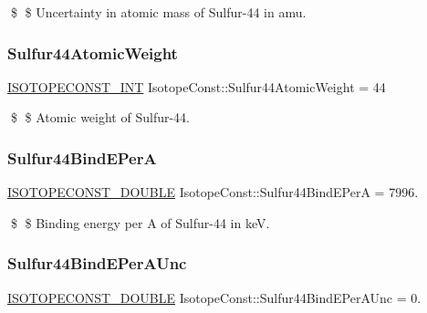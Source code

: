 \$ \$ Uncertainty in atomic mass of Sulfur-\/44 in amu. \mbox{\label{group___isotope_const-_sulfur-_s44_ga68ca9a95a141b35988fc861201869ddd}} 
\subsubsection{\texorpdfstring{Sulfur44\+Atomic\+Weight}{Sulfur44AtomicWeight}}
{\footnotesize\ttfamily \mbox{\hyperlink{group___isotope_const-_macros_ga5f18360b3e99483a35c32d789e62621c}{I\+S\+O\+T\+O\+P\+E\+C\+O\+N\+S\+T\+\_\+\+I\+NT}} Isotope\+Const\+::\+Sulfur44\+Atomic\+Weight = 44}

\$ \$ Atomic weight of Sulfur-\/44. \mbox{\label{group___isotope_const-_sulfur-_s44_ga5cfbd9aa2d10d7919015c029213f9c1b}} 
\subsubsection{\texorpdfstring{Sulfur44\+Bind\+E\+PerA}{Sulfur44BindEPerA}}
{\footnotesize\ttfamily \mbox{\hyperlink{group___isotope_const-_macros_ga8f45a7272ce02c0b4c65c44636ed719a}{I\+S\+O\+T\+O\+P\+E\+C\+O\+N\+S\+T\+\_\+\+D\+O\+U\+B\+LE}} Isotope\+Const\+::\+Sulfur44\+Bind\+E\+PerA = 7996.}

\$ \$ Binding energy per A of Sulfur-\/44 in keV. \mbox{\label{group___isotope_const-_sulfur-_s44_gae96dfb6508c176a13bd55a89d5817709}} 
\subsubsection{\texorpdfstring{Sulfur44\+Bind\+E\+Per\+A\+Unc}{Sulfur44BindEPerAUnc}}
{\footnotesize\ttfamily \mbox{\hyperlink{group___isotope_const-_macros_ga8f45a7272ce02c0b4c65c44636ed719a}{I\+S\+O\+T\+O\+P\+E\+C\+O\+N\+S\+T\+\_\+\+D\+O\+U\+B\+LE}} Isotope\+Const\+::\+Sulfur44\+Bind\+E\+Per\+A\+Unc = 0.}

